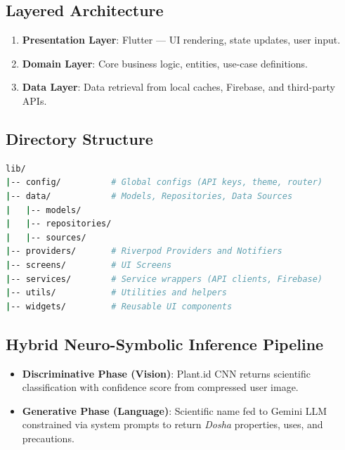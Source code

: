 \subsection{Layered Architecture}
\begin{enumerate}
    \item \textbf{Presentation Layer}: Flutter --- UI rendering, state updates, user input.
    \item \textbf{Domain Layer}: Core business logic, entities, use-case definitions.
    \item \textbf{Data Layer}: Data retrieval from local caches, Firebase, and third-party APIs.
\end{enumerate}

\subsection{Directory Structure}
\begin{lstlisting}[language=bash]
lib/
|-- config/          # Global configs (API keys, theme, router)
|-- data/            # Models, Repositories, Data Sources
|   |-- models/
|   |-- repositories/
|   |-- sources/
|-- providers/       # Riverpod Providers and Notifiers
|-- screens/         # UI Screens
|-- services/        # Service wrappers (API clients, Firebase)
|-- utils/           # Utilities and helpers
|-- widgets/         # Reusable UI components
\end{lstlisting}

\subsection{Hybrid Neuro-Symbolic Inference Pipeline}
\begin{itemize}
    \item \textbf{Discriminative Phase (Vision)}: Plant.id CNN returns scientific
    classification with confidence score from compressed user image.
    \item \textbf{Generative Phase (Language)}: Scientific name fed to Gemini LLM
    constrained via system prompts to return \textit{Dosha} properties, uses, and
    precautions.
\end{itemize}

